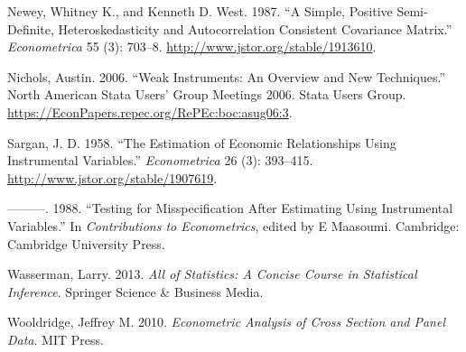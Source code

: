 \documentclass[
  12pt,
]{article}
\newlength{\cslhangindent}
\newenvironment{cslreferences}%
  {\setlength{\parindent}{0pt}%
  \everypar{\setlength{\hangindent}{\cslhangindent}}\ignorespaces}%
  {\par}
\begin{document}
\begin{cslreferences}
\leavevmode\hypertarget{ref-NWe}{}%
Newey, Whitney K., and Kenneth D. West. 1987. ``A Simple, Positive Semi-Definite, Heteroskedasticity and Autocorrelation Consistent Covariance Matrix.'' \emph{Econometrica} 55 (3): 703--8. \url{http://www.jstor.org/stable/1913610}.

\leavevmode\hypertarget{ref-WeakIV}{}%
Nichols, Austin. 2006. ``Weak Instruments: An Overview and New Techniques.'' North American Stata Users' Group Meetings 2006. Stata Users Group. \url{https://EconPapers.repec.org/RePEc:boc:asug06:3}.

\leavevmode\hypertarget{ref-Sargan1958}{}%
Sargan, J. D. 1958. ``The Estimation of Economic Relationships Using Instrumental Variables.'' \emph{Econometrica} 26 (3): 393--415. \url{http://www.jstor.org/stable/1907619}.

\leavevmode\hypertarget{ref-Sargan1988}{}%
---------. 1988. ``Testing for Misspecification After Estimating Using Instrumental Variables.'' In \emph{Contributions to Econometrics}, edited by E Maasoumi. Cambridge: Cambridge University Press.

\leavevmode\hypertarget{ref-wasserman2013all}{}%
Wasserman, Larry. 2013. \emph{All of Statistics: A Concise Course in Statistical Inference}. Springer Science \& Business Media.

\leavevmode\hypertarget{ref-JMW10}{}%
Wooldridge, Jeffrey M. 2010. \emph{Econometric Analysis of Cross Section and Panel Data}. MIT Press.
\end{cslreferences}
\end{document}
